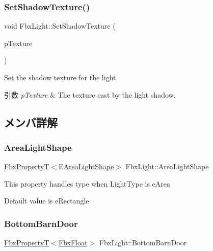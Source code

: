 \subsubsection{\texorpdfstring{Set\+Shadow\+Texture()}{SetShadowTexture()}}
{\footnotesize\ttfamily void Fbx\+Light\+::\+Set\+Shadow\+Texture (\begin{DoxyParamCaption}\item[{\hyperlink{class_fbx_texture}{Fbx\+Texture} $\ast$}]{p\+Texture }\end{DoxyParamCaption})}

Set the shadow texture for the light. 
\begin{DoxyParams}{引数}
{\em p\+Texture} & The texture cast by the light shadow. \\
\hline
\end{DoxyParams}


\subsection{メンバ詳解}
\mbox{\label{class_fbx_light_a2d2ad2128f1ae61151c15d7de259d2e8}} 
\subsubsection{\texorpdfstring{Area\+Light\+Shape}{AreaLightShape}}
{\footnotesize\ttfamily \hyperlink{class_fbx_property_t}{Fbx\+PropertyT}$<$\hyperlink{class_fbx_light_a9bc60eabc41255f46f35d1f6acd274cd}{E\+Area\+Light\+Shape}$>$ Fbx\+Light\+::\+Area\+Light\+Shape}

This property handles type when Light\+Type is e\+Area

Default value is e\+Rectangle \mbox{\label{class_fbx_light_aef1e933e3a3baea5ad804868750cbd04}} 
\subsubsection{\texorpdfstring{Bottom\+Barn\+Door}{BottomBarnDoor}}
{\footnotesize\ttfamily \hyperlink{class_fbx_property_t}{Fbx\+PropertyT}$<$\hyperlink{fbxtypes_8h_aef968e37f2ddc4188de464d8578c1d5c}{Fbx\+Float}$>$ Fbx\+Light\+::\+Bottom\+Barn\+Door}

